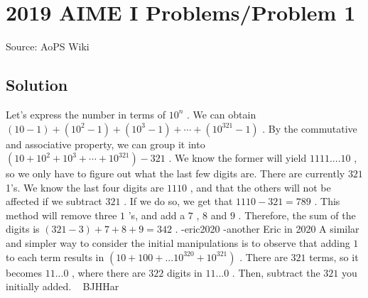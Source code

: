 \documentclass[12pt]{article}
\begin{document}
\section*{{2019 AIME I Problems/Problem 1}}
Source: AoPS Wiki

\subsection*{Solution}
Let's express the number in terms of $10^n$ . We can obtain $(10-1)+(10^2-1)+(10^3-1)+\cdots+(10^{321}-1)$ . By the commutative and associative property, we can group it into $(10+10^2+10^3+\cdots+10^{321})-321$ . We know the former will yield $1111....10$ , so we only have to figure out what the last few digits are. There are currently $321$ 1's. We know the last four digits are $1110$ , and that the others will not be affected if we subtract $321$ . If we do so, we get that $1110-321=789$ . This method will remove three $1$ 's, and add a $7$ , $8$ and $9$ . Therefore, the sum of the digits is $(321-3)+7+8+9=\boxed{342}$ . -eric2020
-another Eric in 2020 A similar and simpler way to consider the initial manipulations is to observe that adding $1$ to each term results in $(10+100+... 10^{320}+10^{321})$ . There are $321$ terms, so it becomes $11...0$ , where there are $322$ digits in $11...0$ . Then, subtract the $321$ you initially added. ~ BJHHar
\end{document}
